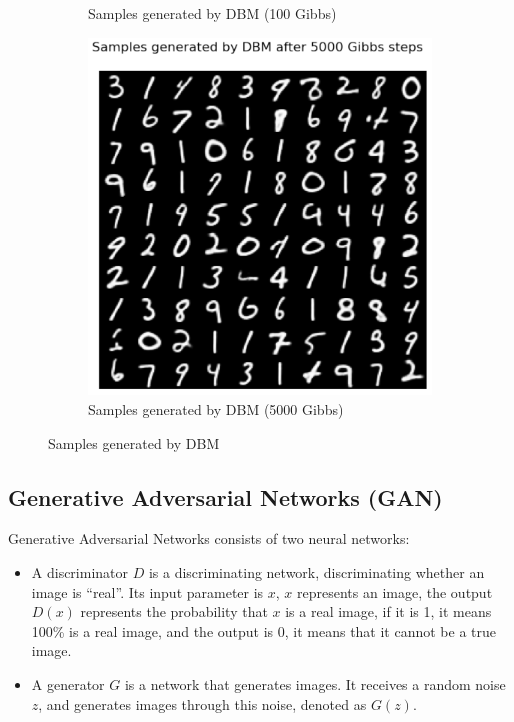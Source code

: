 \documentclass{article}
\begin{document}
\begin{figure}[h!]
\begin{subfigure}[b]{0.3\textwidth}
         \caption{Samples generated by DBM (100 Gibbs)}
         \label{fig:dbm100gibb}
     \end{subfigure}
     \hfill
     \begin{subfigure}[b]{0.3\textwidth}
         \centering
         \includegraphics[width=.9\textwidth]{lab4/dbmgibb5000.pdf}
         \caption{Samples generated by DBM (5000 Gibbs)}
         \label{fig:dbm5000gibb}
     \end{subfigure}
        \caption{Samples generated by DBM}
        \label{fig:dbmsample}
\end{figure}

\subsection{Generative Adversarial Networks (GAN)}
Generative Adversarial Networks consists of two neural networks:
\begin{itemize}
    \item A discriminator $D$ is a discriminating network, discriminating whether an image is ``real''. Its input parameter is $x$, $x$ represents an image, the output $D(x)$ represents the probability that $x$ is a real image, if it is 1, it means 100\% is a real image, and the output is 0, it means that it cannot be a true image.
    \item A generator $G$ is a network that generates images. It receives a random noise $z$, and generates images through this noise, denoted as $G(z)$.
\end{itemize}
\end{document}
